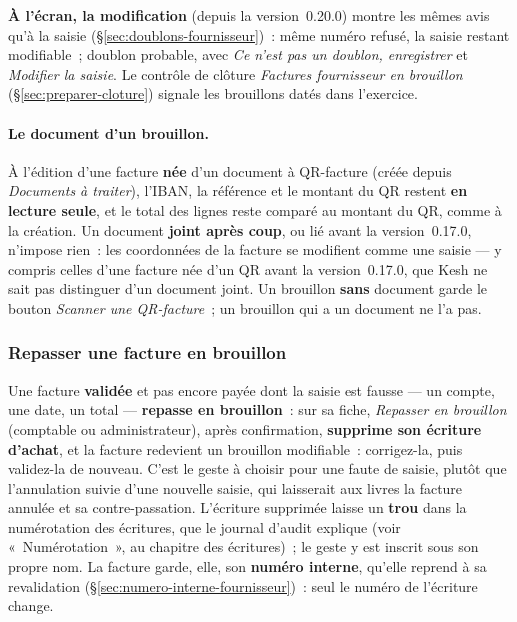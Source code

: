\documentclass[a4paper,11pt,oneside]{article}
\begin{document}
\textbf{À l'écran, la modification} (depuis la version~0.20.0) montre les mêmes avis qu'à la
saisie (\S\ref{sec:doublons-fournisseur})~: même numéro refusé, la saisie restant modifiable~;
doublon probable, avec \emph{Ce n'est pas un doublon, enregistrer} et \emph{Modifier la saisie}.
Le contrôle de clôture \emph{Factures fournisseur en brouillon} (\S\ref{sec:preparer-cloture})
signale les brouillons datés dans l'exercice.

\paragraph{Le document d'un brouillon.} À l'édition d'une facture \textbf{née} d'un document à
QR-facture (créée depuis \emph{Documents à traiter}), l'IBAN, la référence et le montant du QR
restent \textbf{en lecture seule}, et le total des lignes reste comparé au montant du QR, comme à
la création. Un document \textbf{joint après coup}, ou lié avant la version~0.17.0, n'impose
rien~: les coordonnées de la facture se modifient comme une saisie --- y compris celles d'une
facture née d'un QR avant la version~0.17.0, que Kesh ne sait pas distinguer d'un document joint.
Un brouillon \textbf{sans} document garde le bouton \emph{Scanner une QR-facture}~; un brouillon
qui a un document ne l'a pas.

\subsubsection{Repasser une facture en brouillon}\label{sec:repasser-brouillon}

Une facture \textbf{validée} et pas encore payée dont la saisie est fausse --- un compte, une
date, un total --- \textbf{repasse en brouillon}~: sur sa fiche, \emph{Repasser en brouillon}
(comptable ou administrateur), après confirmation, \textbf{supprime son écriture d'achat}, et la
facture redevient un brouillon modifiable~: corrigez-la, puis validez-la de nouveau. C'est le
geste à choisir pour une faute de saisie, plutôt que l'annulation suivie d'une nouvelle saisie,
qui laisserait aux livres la facture annulée et sa contre-passation. L'écriture supprimée laisse
un \textbf{trou} dans la numérotation des écritures, que le journal d'audit explique (voir
«~Numérotation~», au chapitre des écritures)~; le geste y est inscrit sous son propre nom. La facture
garde, elle, son \textbf{numéro interne}, qu'elle reprend à sa revalidation
(\S\ref{sec:numero-interne-fournisseur})~: seul le numéro de l'écriture change.
\end{document}
